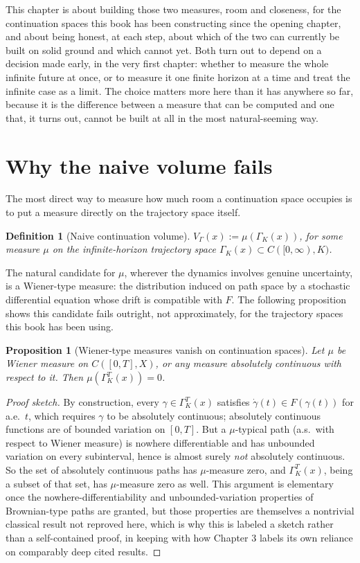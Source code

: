 \documentclass[11pt]{report}
\newtheorem{proposition}{Proposition}[chapter]
\newtheorem{definition}{Definition}[chapter]
\begin{document}
This chapter is about building those two measures, room and
closeness, for the continuation spaces this book has been
constructing since the opening chapter, and about being honest, at
each step, about which of the two can currently be built on solid
ground and which cannot yet. Both turn out to depend on a decision
made early, in the very first chapter: whether to measure the whole
infinite future at once, or to measure it one finite horizon at a time
and treat the infinite case as a limit. The choice matters more here
than it has anywhere so far, because it is the difference between a
measure that can be computed and one that, it turns out, cannot be
built at all in the most natural-seeming way.

\section*{Why the naive volume fails}

The most direct way to measure how much room a continuation space
occupies is to put a measure directly on the trajectory space itself.

\begin{definition}[Naive continuation volume]
$V_\Gamma(x) := \mu(\Gamma_K(x))$, for some measure $\mu$ on the
infinite-horizon trajectory space $\Gamma_K(x) \subset C([0,\infty), K)$.
\end{definition}

The natural candidate for $\mu$, wherever the dynamics involves genuine
uncertainty, is a Wiener-type measure: the distribution induced on path
space by a stochastic differential equation whose drift is compatible
with $F$. The following proposition shows this candidate fails outright,
not approximately, for the trajectory spaces this book has been using.

\begin{proposition}[Wiener-type measures vanish on continuation spaces]
Let $\mu$ be Wiener measure on $C([0,T],X)$, or any measure absolutely
continuous with respect to it. Then $\mu(\Gamma_K^T(x)) = 0$.
\end{proposition}
\begin{proof}[Proof sketch]
By construction, every $\gamma \in \Gamma_K^T(x)$ satisfies
$\dot\gamma(t) \in F(\gamma(t))$ for a.e.\ $t$, which requires $\gamma$
to be absolutely continuous; absolutely continuous functions are of
bounded variation on $[0,T]$. But a $\mu$-typical path (a.s.\ with
respect to Wiener measure) is nowhere differentiable
\cite{paleywienerzygmund1933} and has unbounded variation on every
subinterval, hence is almost surely \emph{not} absolutely continuous.
So the set of absolutely continuous paths has $\mu$-measure zero, and
$\Gamma_K^T(x)$, being a subset of that set, has $\mu$-measure zero as
well. This argument is elementary once the nowhere-differentiability
and unbounded-variation properties of Brownian-type paths are granted,
but those properties are themselves a nontrivial classical result
\cite{paleywienerzygmund1933} not reproved here, which is why this is
labeled a sketch rather than a self-contained proof, in keeping with
how Chapter 3 labels its own reliance on comparably deep cited results.
\end{proof}
\end{document}
